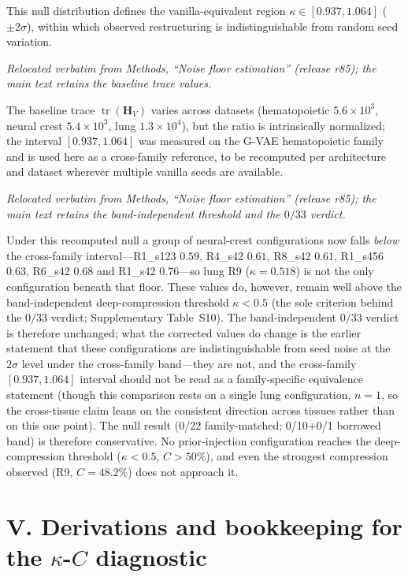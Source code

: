 \documentclass[11 pt,a4 paper]{article}
\begin{document}
This null distribution defines the vanilla-equivalent region $\kappa\in[0.937,1.064]$ ($\pm2\sigma$), within which observed restructuring is indistinguishable from random seed variation.

\noindent\emph{Relocated verbatim from Methods, ``Noise floor estimation'' (release r85); the main text retains the baseline trace values.}

The baseline trace $\operatorname{tr}(\mathbf{H}_V)$ varies across datasets (hematopoietic $5.6\times10^3$, neural crest $5.4\times10^3$, lung $1.3\times10^4$), but the ratio is intrinsically normalized; the interval $[0.937,1.064]$ was measured on the G-VAE hematopoietic family and is used here as a cross-family reference, to be recomputed per architecture and dataset wherever multiple vanilla seeds are available.

\noindent\emph{Relocated verbatim from Methods, ``Noise floor estimation'' (release r85); the main text retains the band-independent threshold and the $0/33$ verdict.}

Under this recomputed null a group of neural-crest configurations now falls \emph{below} the cross-family interval---R1\_s123 $0.59$, R4\_s42 $0.61$, R8\_s42 $0.61$, R1\_s456 $0.63$, R6\_s42 $0.68$ and R1\_s42 $0.76$---so lung R9 ($\kappa=0.518$) is not the only configuration beneath that floor. These values do, however, remain well above the band-independent deep-compression threshold $\kappa<0.5$ (the sole criterion behind the $0/33$ verdict; Supplementary Table~S10). The band-independent $0/33$ verdict is therefore unchanged; what the corrected values do change is the earlier statement that these configurations are indistinguishable from seed noise at the $2\sigma$ level under the cross-family band---they are not, and the cross-family $[0.937,1.064]$ interval should not be read as a family-specific equivalence statement (though this comparison rests on a single lung configuration, $n=1$, so the cross-tissue claim leans on the consistent direction across tissues rather than on this one point). The null result (0/22 family-matched; 0/10+0/1 borrowed band) is therefore conservative. No prior-injection configuration reaches the deep-compression threshold ($\kappa<0.5$, $C>50\%$), and even the strongest compression observed (R9, $C=48.2\%$) does not approach it.

\clearpage

\section*{V. Derivations and bookkeeping for the $\kappa$-$C$ diagnostic}
\end{document}
